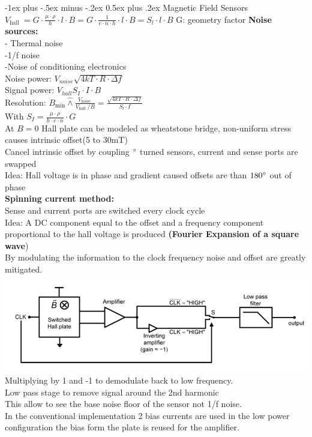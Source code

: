 \documentclass[5pt,landscape]{article}
\makeatletter
\renewcommand{\section}{\@startsection{section}{1}{0mm}%
                                {-1ex plus -.5ex minus -.2ex}%
                                {0.5ex plus .2ex}%
                                {\normalfont\large\bfseries}}
\makeatother
\begin{document}
\begin{multicols*}{5}
\section{Magnetic Field Sensors}
$ V_{\text {hall }}=G \cdot \frac{\mu \cdot \rho}{h} \cdot l \cdot B=G \cdot \frac{1}{e \cdot n \cdot h} \cdot l \cdot B=S_{l} \cdot l \cdot B $
G: geometry factor
\textbf{Noise sources:}\\
- Thermal noise\\
-1/f noise \\
-Noise of conditioning electronics\\
Noise power: $ V_{noise} \sqrt{4kT \cdot R \cdot \Delta f} $\\
Signal power: $ V_{hall} S_I \cdot I \cdot B $\\
Resolution: $ B_{\min } \hat{\wedge} \frac{V_{\text {noise }}}{V_{\text {hall }} / B}=\frac{\sqrt{4 k T \cdot R \cdot \Delta f}}{S_{l} \cdot I} $\\
With $ S_I = \frac{\mu \cdot \rho}{h\cdot e \cdot n} \cdot G $\\
At $ B=0 $ Hall plate can be modeled as wheatstone bridge, non-uniform stress causes intrinsic offset(5 to 30mT)\\
Cancel intrinsic offset by coupling $ \degree  $ turned sensors, current and sense ports are swapped\\
Idea: Hall voltage is in phase and gradient caused offsets are than $ 180 \degree $ out of phase\\
\textbf{Spinning current method:}\\
Sense and current ports are switched every clock cycle\\
Idea: A DC component equal to the offset and a frequency component proportional to the hall voltage is produced \textbf{(Fourier Expansion of a square wave})\\
By modulating the information to the clock frequency noise and offset are greatly mitigated.\\
\includegraphics[width=\columnwidth]{images/switched_hall_system.png}
Multiplying by 1 and -1 to demodulate back to low frequency. \\
Low pass stage to remove signal around the 2nd harmonic\\
This allow to see the base noise floor of the sensor not 1/f noise.\\
In the conventional implementation 2 bias currents are used in the low power configuration the bias form the plate is reused for the amplifier.\\

\end{multicols*}
\end{document}
